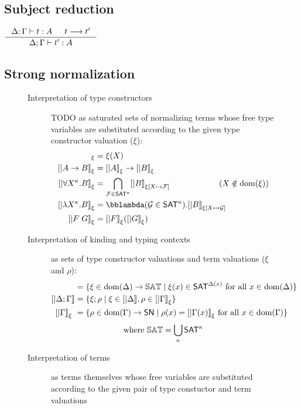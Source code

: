 \subsection*{Subject reduction}
\begin{theorem}
$\inference{\Delta;\Gamma |- t : A  & t --> t'}{\Delta;\Gamma |- t' : A}$
\end{theorem}


\subsection*{Strong normalization}
\begin{figure}
\begin{singlespace}
\begin{description}
\item[Interpretation of type constructors] TODO
	as saturated sets of normalizing terms
	whose free type variables are substituted according to
	the given type constructor valuation ($\xi$):
\begin{align*}
[| X |]_\xi      &= \xi(X) \\ 
[| A -> B |]_\xi &= [|A|]_\xi -> [|B|]_\xi \\
[| \forall X^\kappa . B |]_\xi
	&= \bigcap_{\mathcal{F}\in\SAT^\kappa} [|B|]_{\xi[X\mapsto\mathcal{F}]}
		\qquad\qquad\qquad (X\notin\dom(\xi)) \\
[| \l X^\kappa . B |]_\xi &= \bbl(\mathcal{G} \in \SAT^\kappa) . [|B|]_{\xi[X\mapsto\mathcal{G}]} \\
[| F \; G |]_\xi &= [|F|]_\xi ( [|G|]_\xi )
\end{align*}
\item[Interpretation of kinding and typing contexts]
	as sets of type constructor valuations and term valuations
	($\xi$ and $\rho$):
\begin{align*}
[| \Delta        |] &= \{ \xi \in \dom(\Delta) -> \bbSAT \mid \xi(x)\in\SAT^{\Delta(x)} ~\text{for all}~x\in\dom(\Delta) \} \\
[| \Delta;\Gamma |] &= \{ \xi;\rho \mid \xi\in[|\Delta|], \rho\in[|\Gamma|]_\xi \} \\
[| \Gamma        |]_\xi\ &= \{ \rho \in \dom(\Gamma) -> \SN \mid \rho(x)=[|\Gamma(x)|]_\xi ~\text{for all}~x\in\dom(\Gamma) \}
\end{align*}
\[\text{where}~ \mathbb{SAT} = \bigcup_{\kappa} \mathsf{SAT}^\kappa \]
\item[Interpretation of terms]
	as terms themselves whose free variables are substituted according to
	the given pair of type constuctor and term valuations

\end{description}
\end{singlespace}
\end{figure}

